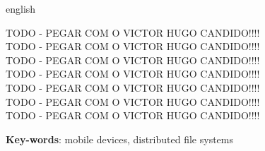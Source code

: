 \documentclass[
	12pt,				%
	openright,			%
	oneside,			%
	a4paper,			%
	english,			%
	brazil				%
	]{abntex2}
\begin{document}
\begin{resumo}[Abstract]
 \begin{otherlanguage*}{english}
 
    TODO - PEGAR COM O VICTOR HUGO CANDIDO!!!!\\
    TODO - PEGAR COM O VICTOR HUGO CANDIDO!!!!\\
    TODO - PEGAR COM O VICTOR HUGO CANDIDO!!!!\\
    TODO - PEGAR COM O VICTOR HUGO CANDIDO!!!!\\
    TODO - PEGAR COM O VICTOR HUGO CANDIDO!!!!\\
    TODO - PEGAR COM O VICTOR HUGO CANDIDO!!!!\\
    TODO - PEGAR COM O VICTOR HUGO CANDIDO!!!!
    

   \vspace{\onelineskip}
 
   \noindent 
   \textbf{Key-words}: mobile devices, distributed file systems
 \end{otherlanguage*}
\end{resumo}


\listoffigures*
\cleardoublepage
\listoftables*
\cleardoublepage

\begin{siglas}

\end{siglas}

\begin{comment}
\begin{simbolos}


\end{simbolos}
\end{comment}


\tableofcontents*
\cleardoublepage



\textual





\postextual
\end{document}
